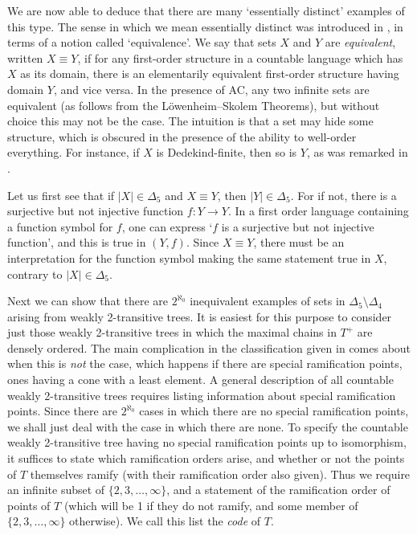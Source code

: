 \documentclass[a4paper,reqno]{amsart}
\numberwithin{equation}{section}
\begin{document}
We are now able to deduce that there are many `essentially distinct' examples of this type. The sense in which
we mean essentially distinct was introduced in \cite{Truss4}, in terms of a notion called `equivalence'. We say 
that sets $X$ and $Y$ are {\em equivalent}, written $X \equiv Y$, if for any first-order structure in a countable 
language which has $X$ as its domain, there is an elementarily equivalent first-order structure having domain $Y$, 
and vice versa. In the presence of AC, any two infinite sets are equivalent (as follows from the L\"owenheim--Skolem 
Theorems), but without choice this may not be the case. The intuition is that a set may hide some structure, which is 
obscured in the presence of the ability to well-order everything. For instance, if $X$ is Dedekind-finite, then so 
is $Y$, as was remarked in \cite{Truss4}. 

Let us first see that if $|X| \in \Delta_5$ and $X \equiv Y$, then $|Y| \in \Delta_5$. For if not, there is a
surjective but not injective function $f: Y \to Y$. In a first order language containing a function symbol for $f$,
one can express `$f$ is a surjective but not injective function', and this is true in $(Y, f)$. Since $X \equiv Y$,
there must be an interpretation for the function symbol making the same statement true in $X$, contrary to 
$|X| \in \Delta_5$.

Next we can show that there are $2^{\aleph_0}$ inequivalent examples of sets in $\Delta_5 \setminus \Delta_4$ arising 
from weakly 2-transitive trees. It is easiest for this purpose to consider just those weakly 2-transitive trees
in which the maximal chains in $T^+$ are densely ordered. The main complication in the classification given in
\cite{Droste2} comes about when this is {\em not} the case, which happens if there are special ramification points,
ones having a cone with a least element. A general description of all countable weakly 2-transitive trees requires 
listing information about special ramification points. Since there are $2^{\aleph_0}$ cases in which there are no 
special ramification points, we shall just deal with the case in which there are none. To specify the countable 
weakly 2-transitive tree having no special ramification points up to isomorphism, it suffices to state which 
ramification orders arise, and whether or not the points of $T$ themselves ramify (with their ramification order 
also given). Thus we require an infinite subset of $\{2, 3, \ldots, \infty\}$, and a statement of the ramification 
order of points of $T$ (which will be 1 if they do not ramify, and some member of
$\{2, 3, \ldots, \infty\}$ otherwise). We call this list the {\em code} of $T$.
\end{document}

